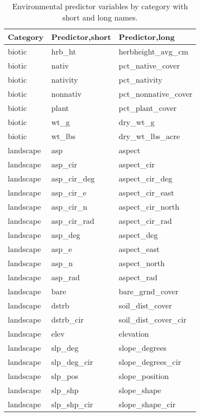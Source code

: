 \documentclass[
]{article}
\begin{document}
\begin{table}

\caption{\label{tab:tab-predictors}Environmental predictor variables by category with short and long names.}
\centering
\begin{tabular}[t]{l|l|l}
\hline
Category & Predictor,short & Predictor,long\\
\hline
biotic & hrb\_ht & herbheight\_avg\_cm\\
\hline
biotic & nativ & pct\_native\_cover\\
\hline
biotic & nativity & pct\_nativity\\
\hline
biotic & nonnativ & pct\_nonnative\_cover\\
\hline
biotic & plant & pct\_plant\_cover\\
\hline
biotic & wt\_g & dry\_wt\_g\\
\hline
biotic & wt\_lbs & dry\_wt\_lbs\_acre\\
\hline
landscape & asp & aspect\\
\hline
landscape & asp\_cir & aspect\_cir\\
\hline
landscape & asp\_cir\_deg & aspect\_cir\_deg\\
\hline
landscape & asp\_cir\_e & aspect\_cir\_east\\
\hline
landscape & asp\_cir\_n & aspect\_cir\_north\\
\hline
landscape & asp\_cir\_rad & aspect\_cir\_rad\\
\hline
landscape & asp\_deg & aspect\_deg\\
\hline
landscape & asp\_e & aspect\_east\\
\hline
landscape & asp\_n & aspect\_north\\
\hline
landscape & asp\_rad & aspect\_rad\\
\hline
landscape & bare & bare\_grnd\_cover\\
\hline
landscape & dstrb & soil\_dist\_cover\\
\hline
landscape & dstrb\_cir & soil\_dist\_cover\_cir\\
\hline
landscape & elev & elevation\\
\hline
landscape & slp\_deg & slope\_degrees\\
\hline
landscape & slp\_deg\_cir & slope\_degrees\_cir\\
\hline
landscape & slp\_pos & slope\_position\\
\hline
landscape & slp\_shp & slope\_shape\\
\hline
landscape & slp\_shp\_cir & slope\_shape\_cir\\

\end{tabular}
\end{table}
\end{document}
